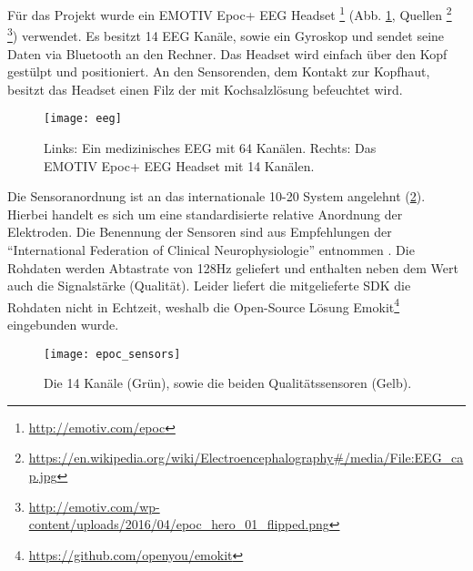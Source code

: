 \label{chap:eeg}
Für das Projekt wurde ein EMOTIV Epoc+ EEG Headset \footnote{\url{http://emotiv.com/epoc}} (Abb. \ref{fig:eeg}, Quellen \footnote{\url{https://en.wikipedia.org/wiki/Electroencephalography\#/media/File:EEG_cap.jpg}} \footnote{\url{http://emotiv.com/wp-content/uploads/2016/04/epoc_hero_01_flipped.png}}) verwendet. Es besitzt 14 EEG Kanäle, sowie ein Gyroskop und sendet seine Daten via Bluetooth an den Rechner. Das Headset wird einfach über den Kopf gestülpt und positioniert. An den Sensorenden, dem Kontakt zur Kopfhaut, besitzt das Headset einen Filz der mit Kochsalzlösung befeuchtet wird.

\begin{figure}[h] 
  \begin{center}
    \texttt{[image: eeg]}
    \caption[Medzinisches EEG / EMOTIV Epoc+]{Links: Ein medizinisches EEG mit 64 Kanälen. Rechts: Das EMOTIV Epoc+ EEG Headset mit 14 Kanälen.\label{fig:eeg}}
  \end{center}
\end{figure}

Die Sensoranordnung ist an das internationale 10-20 System \cite{10-20}  angelehnt (\ref{fig:epoc_sensors}). Hierbei handelt es sich um eine standardisierte relative Anordnung der Elektroden. Die Benennung der Sensoren  sind aus Empfehlungen der "`International Federation of Clinical Neurophysiologie"' entnommen \cite{ifcn}. Die Rohdaten werden Abtastrate von 128Hz geliefert und enthalten neben dem Wert auch die Signalstärke (Qualität). Leider liefert die mitgelieferte SDK die Rohdaten nicht in Echtzeit, weshalb die Open-Source Lösung Emokit\footnote{\url{https://github.com/openyou/emokit}} eingebunden wurde.

\begin{figure}[h] 
  \begin{center}
    \texttt{[image: epoc\_sensors]}
    \caption[EEG Sensoranordnung]{Die 14 Kanäle (Grün), sowie die beiden Qualitätssensoren (Gelb).\label{fig:epoc_sensors}}
  \end{center}
\end{figure}